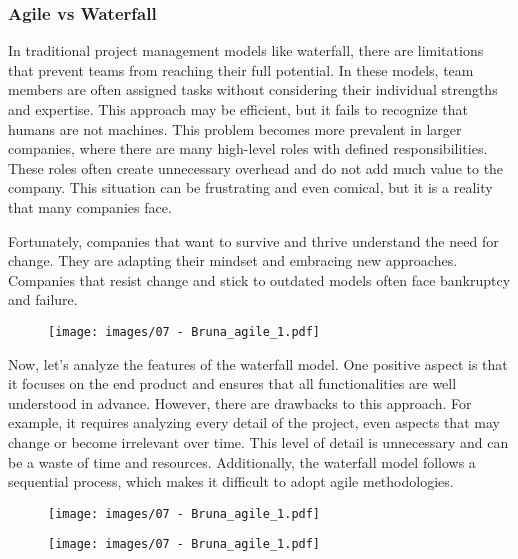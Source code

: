 \subsubsection{Agile vs Waterfall}

In traditional project management models like waterfall, there are
limitations that prevent teams from reaching their full potential. In
these models, team members are often assigned tasks without considering
their individual strengths and expertise. This approach may be
efficient, but it fails to recognize that humans are not machines. This
problem becomes more prevalent in larger companies, where there are many
high-level roles with defined responsibilities. These roles often create
unnecessary overhead and do not add much value to the company. This
situation can be frustrating and even comical, but it is a reality that
many companies face.

Fortunately, companies that want to survive and thrive understand the
need for change. They are adapting their mindset and embracing new
approaches. Companies that resist change and stick to outdated models
often face bankruptcy and failure.

\begin{figure}[!h]
  \centering
  \texttt{[image: images/07 - Bruna\_agile\_1.pdf]}
\end{figure}

Now, let's analyze the features of the waterfall model. One positive
aspect is that it focuses on the end product and ensures that all
functionalities are well understood in advance. However, there are
drawbacks to this approach. For example, it requires analyzing every
detail of the project, even aspects that may change or become irrelevant
over time. This level of detail is unnecessary and can be a waste of
time and resources. Additionally, the waterfall model follows a
sequential process, which makes it difficult to adopt agile
methodologies.

\begin{figure}[!h]
  \centering
  \texttt{[image: images/07 - Bruna\_agile\_1.pdf]}
\end{figure}

\begin{figure}[!h]
  \centering
  \texttt{[image: images/07 - Bruna\_agile\_1.pdf]}
\end{figure}

